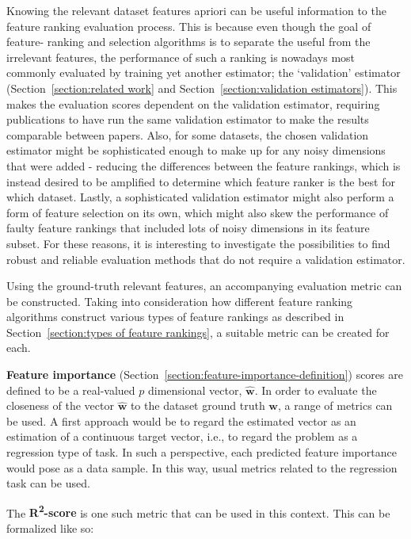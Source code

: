 \documentclass{article}
\begin{document}
Knowing the relevant dataset features apriori can be useful information to the feature ranking evaluation process. This is because even though the goal of feature- ranking and selection algorithms is to separate the useful from the irrelevant features, the performance of such a ranking is nowadays most commonly evaluated by training yet another estimator; the `validation' estimator (Section~\ref{section:related work} and Section~\ref{section:validation estimators}). This makes the evaluation scores dependent on the validation estimator, requiring publications to have run the same validation estimator to make the results comparable between papers. Also, for some datasets, the chosen validation estimator might be sophisticated enough to make up for any noisy dimensions that were added - reducing the differences between the feature rankings, which is instead desired to be amplified to determine which feature ranker is the best for which dataset. Lastly, a sophisticated validation estimator might also perform a form of feature selection on its own, which might also skew the performance of faulty feature rankings that included lots of noisy dimensions in its feature subset. For these reasons, it is interesting to investigate the possibilities to find robust and reliable evaluation methods that do not require a validation estimator.

Using the ground-truth relevant features, an accompanying evaluation metric can be constructed. Taking into consideration how different feature ranking algorithms construct various types of feature rankings as described in Section~\ref{section:types of feature rankings}, a suitable metric can be created for each.

\textbf{Feature importance} (Section~\ref{section:feature-importance-definition}) scores are defined to be a real-valued $p$ dimensional vector, $\hat{\boldsymbol{w}}$. In order to evaluate the closeness of the vector $\hat{\boldsymbol{w}}$ to the dataset ground truth $\boldsymbol{w}$, a range of metrics can be used. A first approach would be to regard the estimated vector as an estimation of a continuous target vector, i.e., to regard the problem as a regression type of task. In such a perspective, each predicted feature importance would pose as a data sample. In this way, usual metrics related to the regression task can be used.

The \textbf{R\textsuperscript{2}-score} is one such metric that can be used in this context. This can be formalized like so:
\end{document}
